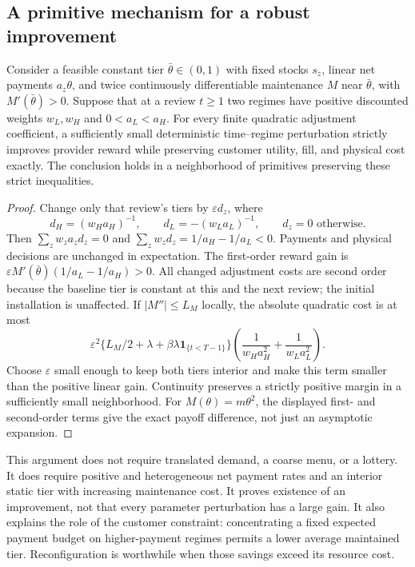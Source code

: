 \subsection{A primitive mechanism for a robust improvement}
\begin{theorem}\label{thm:local-gain}
Consider a feasible constant tier $\bar\theta\in(0,1)$ with fixed stocks $s_z$, linear net payments $a_z\theta$, and twice continuously differentiable maintenance $M$ near $\bar\theta$, with $M'(\bar\theta)>0$. Suppose that at a review $t\geq1$ two regimes have positive discounted weights $w_L,w_H$ and $0<a_L<a_H$. For every finite quadratic adjustment coefficient, a sufficiently small deterministic time--regime perturbation strictly improves provider reward while preserving customer utility, fill, and physical cost exactly. The conclusion holds in a neighborhood of primitives preserving these strict inequalities.
\end{theorem}
\begin{proof}
Change only that review's tiers by $\varepsilon d_z$, where
\[
 d_H=(w_Ha_H)^{-1},\qquad d_L=-(w_La_L)^{-1},\qquad d_z=0\text{ otherwise}.
\]
Then $\sum_z w_za_zd_z=0$ and $\sum_z w_zd_z=1/a_H-1/a_L<0$. Payments and physical decisions are unchanged in expectation. The first-order reward gain is
$\varepsilon M'(\bar\theta)(1/a_L-1/a_H)>0$.
All changed adjustment costs are second order because the baseline tier is constant at this and the next review; the initial installation is unaffected. If $|M''|\leq L_M$ locally, the absolute quadratic cost is at most
\[
 \varepsilon^2\{L_M/2+\lambda+\beta\lambda\mathbf1_{\{t<T-1\}}\}
       \left(\frac1{w_Ha_H^2}+\frac1{w_La_L^2}\right).
\]
Choose $\varepsilon$ small enough to keep both tiers interior and make this term smaller than the positive linear gain. Continuity preserves a strictly positive margin in a sufficiently small neighborhood. For $M(\theta)=m\theta^2$, the displayed first- and second-order terms give the exact payoff difference, not just an asymptotic expansion.
\end{proof}
This argument does not require translated demand, a coarse menu, or a lottery. It does require positive and heterogeneous net payment rates and an interior static tier with increasing maintenance cost. It proves existence of an improvement, not that every parameter perturbation has a large gain. It also explains the role of the customer constraint: concentrating a fixed expected payment budget on higher-payment regimes permits a lower average maintained tier. Reconfiguration is worthwhile when those savings exceed its resource cost.


